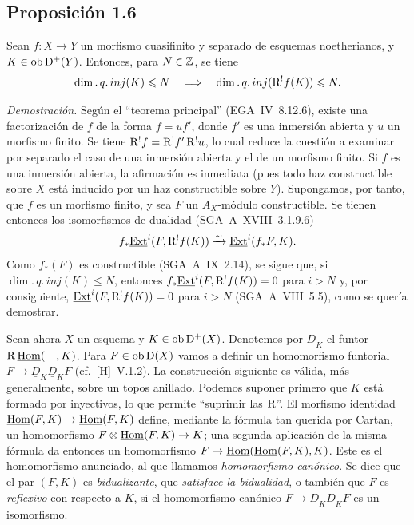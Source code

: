 \subsection*{Proposición 1.6}
Sean $f : X \to Y$ un morfismo cuasifinito y separado de esquemas noetherianos, y $K \in \operatorname{ob} \mathrm{D}^{+}(Y)$. Entonces, para $N \in \mathbb{Z}$, se tiene
\[
\dim.\,q.\,inj(K) \leqslant N \quad \Longrightarrow \quad \dim.\,q.\,inj(\mathrm{R}^{!}f(K)) \leqslant N.
\]

\emph{Demostración.} Según el ``teorema principal'' (EGA~IV~8.12.6), existe una factorización de $f$ de la forma $f = uf'$, donde $f'$ es una inmersión abierta y $u$ un morfismo finito. Se tiene $\mathrm{R}^{!}f = \mathrm{R}^{!}f' \, \mathrm{R}^{!}u$, lo cual reduce la cuestión a examinar por separado el caso de una inmersión abierta y el de un morfismo finito. Si $f$ es una inmersión abierta, la afirmación es inmediata (pues todo haz constructible sobre $X$ está inducido por un haz constructible sobre $Y$). Supongamos, por tanto, que $f$ es un morfismo finito, y sea $F$ un $A_X$-módulo constructible. Se tienen entonces los isomorfismos de dualidad (SGA~A~XVIII~3.1.9.6)
\[
f_{*}\underline{\operatorname{Ext}}^i(F, \mathrm{R}^{!}f(K)) \xrightarrow{\sim} \underline{\operatorname{Ext}}^i(f_{*}F, K).
\]
Como $f_{*}(F)$ es constructible (SGA~A~IX~2.14), se sigue que, si $\dim.\,q.\,inj(K) \leqslant N$, entonces $f_{*}\underline{\operatorname{Ext}}^i(F, \mathrm{R}^{!}f(K)) = 0$ para $i > N$ y, por consiguiente, $\underline{\operatorname{Ext}}^i(F, \mathrm{R}^{!}f(K)) = 0$ para $i > N$ (SGA~A~VIII~5.5), como se quería demostrar.

Sean ahora $X$ un esquema y $K \in \operatorname{ob} \mathrm{D}^{+}(X)$. Denotemos por $\underline{D}_K$ el funtor $\mathrm{R}\,\underline{\operatorname{Hom}}(\quad, K)$. Para $F \in \operatorname{ob} \mathrm{D}(X)$ vamos a definir un homomorfismo funtorial $F \to \underline{D}_K \underline{D}_K F$ (cf.~[H]~V.1.2). La construcción siguiente es válida, más generalmente, sobre un topos anillado. Podemos suponer primero que $K$ está formado por inyectivos, lo que permite ``suprimir las $\mathrm{R}$''. El morfismo identidad $\underline{\operatorname{Hom}}(F,K) \to \underline{\operatorname{Hom}}(F,K)$ define, mediante la fórmula tan querida por Cartan, un homomorfismo $F \otimes \underline{\operatorname{Hom}}(F,K) \to K$; una segunda aplicación de la misma fórmula da entonces un homomorfismo $F \to \underline{\operatorname{Hom}}(\underline{\operatorname{Hom}}(F,K), K)$. Este es el homomorfismo anunciado, al que llamamos \emph{homomorfismo canónico}. Se dice que el par $(F,K)$ es \emph{bidualizante}, que \emph{satisface la bidualidad}, o también que $F$ es \emph{reflexivo} con respecto a $K$, si el homomorfismo canónico $F \to \underline{D}_K \underline{D}_K F$ es un isomorfismo.

